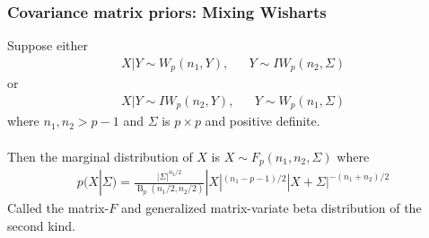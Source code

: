\documentclass[xcolor=dvipsnames]{beamer}
\DeclareMathOperator{\tr}{tr}
\DeclareMathOperator{\B}{B}
\begin{document}




\begin{frame}
  \frametitle{Covariance matrix priors: Mixing Wisharts}
Suppose either 
\begin{align*}
X|Y \sim W_p(n_1,Y), &&Y\sim IW_p(n_2,\Sigma)
\end{align*}
or
\begin{align*}
X|Y \sim IW_p(n_2,Y), &&Y\sim W_p(n_1,\Sigma)
\end{align*}
where $n_1,n_2>p-1$ and $\Sigma$ is $p\times p$ and positive definite.\\~\\
\pause 
Then the marginal distribution of $X$ is $X\sim F_p(n_1,n_2,\Sigma)$ where
\begin{align*}
 p(X|\Sigma) = \frac{\left|\Sigma\right|^{n_2/2}}{\B_p(n_1/2,n_2/2)}|X|^{(n_1 - p - 1)/2}|X + \Sigma|^{-(n_1 + n_2)/2}
\end{align*}
Called the matrix-$F$ and generalized matrix-variate beta distribution of the second kind.
\end{frame}

\end{document}

